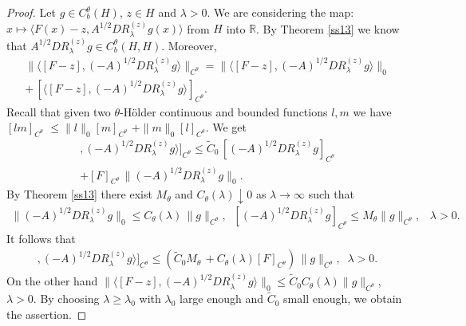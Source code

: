 \documentclass[preprint]{imsart}
\def\R{\mathbb R}
\begin{document}
\begin{proof}  
    Let $g \in C_b^{\theta}(H)$, $z \in H$ and   
  $\lambda>0$.  We are considering the map: $x \mapsto \langle F(x) - z, A^{1/2} D R^{(z)}_{\lambda} g (x)\rangle$ from $H$ into $\R$.
  By  Theorem \ref{ss13} we know that  $A^{1/2} D R^{(z)}_{\lambda} g  \in C_b^{\theta} (H,H)$. Moreover, 
\begin{gather*}
\| \langle   [  F   - z]  , (-A)^{1/2}    D  R^{(z)}_{\lambda} g \rangle \|_{C^{\theta}} = \| \langle   [  F   - z]  , (-A)^{1/2}    D  R^{(z)}_{\lambda} g \rangle \|_{0} \\ + \,
 [ \langle   [  F   - z]  , (-A)^{1/2}    D  R^{(z)}_{\lambda} g \rangle ]_{C^{\theta}}.
\end{gather*}  
Recall  that  
 given two $\theta$-H\"older continuous and bounded functions $l,m$ we have 
$ [ lm ]_{C^{\theta}}$ $\le \| l\|_0 [m]_{C^{\theta}}$ $+ \| m\|_0 [l]_{C^{\theta}}$.  We get
\begin{gather*}
[ \langle   [  F   - z]  , (-A)^{1/2}     D  R^{(z)}_{\lambda} g  \rangle ]_{C^{\theta}} \le 
 {\tilde C_0}  \,  [ (-A)^{1/2}  D  R^{(z)}_{\lambda} g  ]_{C^{\theta}}  
 \\
 + [F]_{C^{\theta}} \, \| (-A)^{1/2}   D  R^{(z)}_{\lambda} g  \|_0. 
 \end{gather*}
By Theorem \ref{ss13}
there exist $M_{\theta}$  and $C_{\theta}(\lambda) \downarrow 0$ as $\lambda \to \infty$ such that 
\begin{gather*}
 \| (-A)^{1/2} D  R^{(z)}_{\lambda} g \|_0 \le  C_{\theta}(\lambda) \,   \|g \|_{C^{\theta}},\;\; [ (-A)^{1/2} D  R^{(z)}_{\lambda} g ]_{C^{\theta}}
  \le M_{\theta} \| g \|_{C^{\theta}},\;\;\; \lambda>0.
\end{gather*}
It follows that 
\begin{gather*}
[ \langle   [  F   - z]  , (-A)^{1/2}     D  R^{(z)}_{\lambda} g  \rangle ]_{C^{\theta}}
\le ({\tilde C_0} M_{\theta}  \, + C_{\theta}(\lambda)  [F]_{C^{\theta}}) \,   \| g  \|_{C^{\theta}}, \;\; \lambda>0.  
\end{gather*}
On the other hand $\|  \langle   [  F   - z]  , (-A)^{1/2}     D  R^{(z)}_{\lambda} g  \rangle \|_0  \le {\tilde C_0} C_{\theta}(\lambda) \| g  \|_{C^{\theta}}$, $\lambda >0.$
  By choosing $\lambda \ge \lambda_0$ with $\lambda_0$ large enough  and ${\tilde C_0}$ small enough, we obtain the assertion. 
  \end{proof} 
\end{document}
